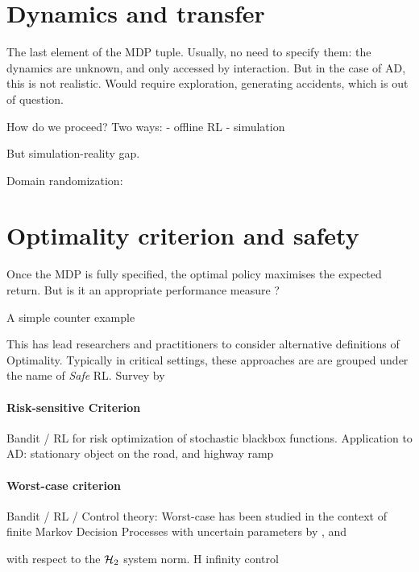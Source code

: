 \section{Dynamics and transfer}

The last element of the MDP tuple.
Usually, no need to specify them: the dynamics are unknown, and only accessed by interaction.
But in the case of AD, this is not realistic.
Would require exploration, generating accidents, which is out of question.
 
How do we proceed?
Two ways: 
- offline RL
- simulation

But simulation-reality gap.
\citep{Pan2017,Liang2019}

Domain randomization: \citep{Tobin2017}

\section{Optimality criterion and safety}

Once the MDP is fully specified, the optimal policy maximises the expected return.
But is it an appropriate performance measure ?

A simple counter example

This has lead researchers and practitioners to consider alternative definitions of Optimality. Typically in critical settings, these approaches are are grouped under the name of \emph{Safe} RL.
Survey by \citep{Garcia2015}

\paragraph{Risk-sensitive Criterion}

Bandit / RL
\citep{Torossian19a} for risk optimization of stochastic blackbox functions.
Application to AD: \citep{Naghshvar2018} stationary object on the road, and highway ramp


\paragraph{Worst-case criterion}

Bandit / RL / Control theory:
Worst-case has been studied in the context of finite Markov Decision Processes with uncertain parameters by \citet{Iyengar2005}, \citet{Nilim2005} and \citet{Wiesemann2013}

\citep{Berkenkamp2015} with respect to the $\mathcal{H}_2$ system norm.
H infinity control

